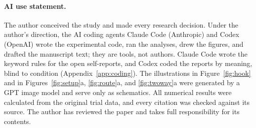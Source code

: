 \paragraph{AI use statement.}
The author conceived the study and made every research decision. Under
the author's direction, the AI coding agents Claude Code (Anthropic) and
Codex (OpenAI) wrote the experimental code, ran the analyses, drew the
figures, and drafted the manuscript text; they are tools, not authors.
Claude Code wrote the keyword rules for the open self-reports, and Codex
coded the reports by meaning, blind to condition
(Appendix~\ref{app:coding}). The illustrations in
Figure~\ref{fig:hook} and in Figures~\ref{fig:setup}a, \ref{fig:route}a,
and \ref{fig:twoway}a were generated by a GPT image model and serve only
as schematics. All numerical results were calculated from the original
trial data, and every citation was checked against its source. The
author has reviewed the paper and takes full responsibility for its
contents.
